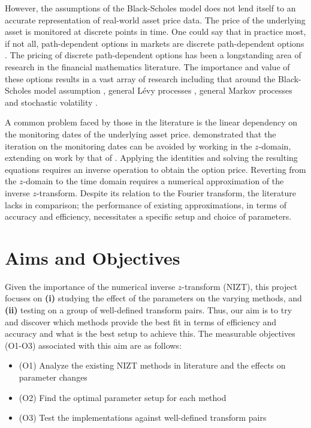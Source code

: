 \documentclass[a4paper]{report}
\begin{document}
However, the assumptions of the Black-Scholes model does not lend itself to an accurate representation of real-world asset price data. The price of the underlying asset is monitored at discrete points in time. One could say that in practice most, if not all, path-dependent options in markets are discrete path-dependent options \citep{kou2007discrete}. The pricing of discrete path-dependent options has been a longstanding area of research in the financial mathematics literature. The importance and value of these options results in a vast array of research including that around the Black-Scholes model assumption \citep{lu2017improved, guardasoni2020mellin}, general L\'evy processes \citep{fang2009novel, fusai2016spitzer, phelan2018fourier, chen2021sinc, levendorskii2022sinh}, general Markov processes \citep{cui2021pricing, zhang2023general} and stochastic volatility \citep{soleymani2019pricing, kirkby2020efficient}.

A common problem faced by those in the literature is the linear dependency on the monitoring dates of the underlying asset price. \citet{fusai2016spitzer} demonstrated that the iteration on the monitoring dates can be avoided by working in the $z$-domain, extending on work by that of \citet{carr1999option}. Applying the \citet{spitzer1957wiener} identities and solving the resulting equations requires an inverse operation to obtain the option price. Reverting from the $z$-domain to the time domain requires a numerical approximation of the inverse $z$-transform. Despite its relation to the Fourier transform, the literature lacks in comparison; the performance of existing approximations, in terms of accuracy and efficiency, necessitates a specific setup and choice of parameters.

\section{Aims and Objectives}
Given the importance of the numerical inverse $z$-transform (NIZT), this project focuses on \textbf{(i)} studying the effect of the parameters on the varying methods, and \textbf{(ii)} testing on a group of well-defined transform pairs. Thus, our aim is to try and discover which methods provide the best fit in terms of efficiency and accuracy and what is the best setup to achieve this. The measurable objectives (O1-O3) associated with this aim are as follows:

\begin{itemize}
	\item (O1) Analyze the existing NIZT methods in literature and the effects on parameter changes
	\item (O2) Find the optimal parameter setup for each method
	\item (O3) Test the implementations against well-defined transform pairs
\end{itemize}
\end{document}
